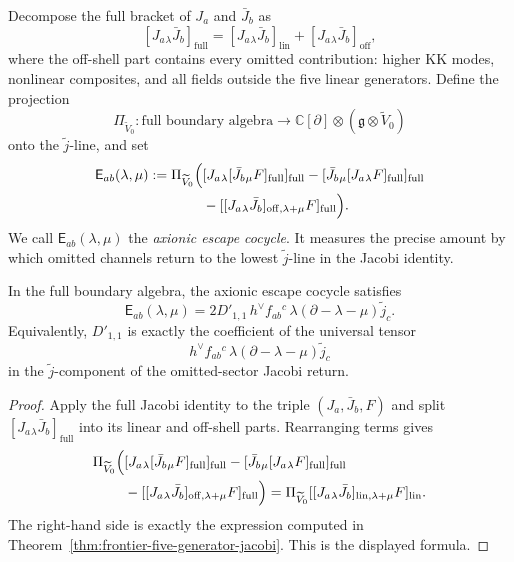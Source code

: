 \begin{definition}
\label{def:frontier-axionic-escape-cocycle}
Decompose the full bracket of $J_a$ and $\bar J_b$ as
\[
[J_a{}_{\lambda}\bar J_b]_{\mathrm{full}}
=
[J_a{}_{\lambda}\bar J_b]_{\mathrm{lin}}
+
[J_a{}_{\lambda}\bar J_b]_{\mathrm{off}},
\]
where the off-shell part contains every omitted contribution:
higher KK modes, nonlinear composites, and all fields outside the five
linear generators.
Define the projection
\[
\Pi_{\widetilde V_0}\colon
\text{full boundary algebra}
\longrightarrow
\mathbb C[\partial]\otimes (\mathfrak g\otimes \widetilde V_0)
\]
onto the $\widetilde j$-line, and set
\begin{align*}
\mathsf E_{ab}(\lambda,\mu)
:=
\Pi_{\widetilde V_0}\Bigl(&
[J_a{}_{\lambda}[\bar J_b{}_{\mu}F]_{\mathrm{full}}]_{\mathrm{full}}
-[\bar J_b{}_{\mu}[J_a{}_{\lambda}F]_{\mathrm{full}}]_{\mathrm{full}}
\\
&-[[J_a{}_{\lambda}\bar J_b]_{\mathrm{off},\lambda+\mu}F]_{\mathrm{full}}
\Bigr).
\end{align*}
We call $\mathsf E_{ab}(\lambda,\mu)$ the
\emph{axionic escape cocycle}.
It measures the precise amount by which omitted channels return to the
lowest $\widetilde j$-line in the Jacobi identity.
\end{definition}

\begin{corollary}
\label{cor:frontier-first-equation-for-D11}
In the full boundary algebra, the axionic escape cocycle satisfies
\[
\mathsf E_{ab}(\lambda,\mu)
=
2D'_{1,1}\,h^\vee f_{ab}{}^c\,
\lambda(\partial-\lambda-\mu)\widetilde j_c.
\]
Equivalently, $D'_{1,1}$ is exactly the coefficient of the universal tensor
\[
h^\vee f_{ab}{}^c\,\lambda(\partial-\lambda-\mu)\widetilde j_c
\]
in the $\widetilde j$-component of the omitted-sector Jacobi return.
\end{corollary}

\begin{proof}
Apply the full Jacobi identity to the triple $(J_a,\bar J_b,F)$ and split
$[J_a{}_{\lambda}\bar J_b]_{\mathrm{full}}$ into its linear and off-shell
parts.
Rearranging terms gives
\begin{align*}
\Pi_{\widetilde V_0}\Bigl(
&[J_a{}_{\lambda}[\bar J_b{}_{\mu}F]_{\mathrm{full}}]_{\mathrm{full}}
-[\bar J_b{}_{\mu}[J_a{}_{\lambda}F]_{\mathrm{full}}]_{\mathrm{full}}
\\
&-[[J_a{}_{\lambda}\bar J_b]_{\mathrm{off},\lambda+\mu}F]_{\mathrm{full}}
\Bigr)
=
\Pi_{\widetilde V_0}
[[J_a{}_{\lambda}\bar J_b]_{\mathrm{lin},\lambda+\mu}F]_{\mathrm{lin}}.
\end{align*}
The right-hand side is exactly the expression computed in
Theorem~\ref{thm:frontier-five-generator-jacobi}.
This is the displayed formula.
\end{proof}

